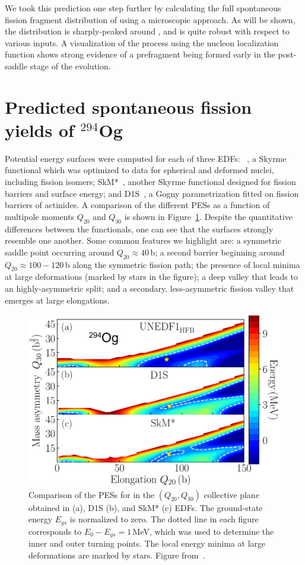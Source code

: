 We took this prediction one step further by calculating the full spontaneous fission fragment distribution of {\Og} using a microscopic approach. As will be shown, the distribution is sharply-peaked around {\Pb}, and is quite robust with respect to various inputs. A visualization of the process using the nucleon localization function shows strong evidence of a {\Pb} prefragment being formed early in the post-saddle stage of the evolution.

\section{Predicted spontaneous fission yields of $^{294}$Og}

Potential energy surfaces were computed for each of three EDFs: \hfb~\cite{Schunck2015}, a Skyrme functional which was optimized to data for spherical and deformed nuclei, including fission isomers; SkM*~\cite{Bartel1982}, another Skyrme functional designed for fission barriers and surface energy; and D1S~\cite{Berger1989}, a Gogny parametrization fitted on fission barriers of actinides. A comparison of the different PESs as a function of multipole moments $Q_{20}$ and $Q_{30}$ is shown in Figure~\ref{fig:294ogthreepes}. Despite the quantitative differences between the functionals, one can see that the surfaces strongly resemble one another. Some common features we highlight are: a symmetric saddle point occurring around $Q_{20}\approx 40$\,b; a second barrier beginning around $Q_{20}\approx100-120$\,b along the symmetric fission path; the presence of local minima at large deformations (marked by stars in the figure); a deep valley that leads to an highly-asymmetric split; and a secondary, less-asymmetric fission valley that emerges at large elongations.


\begin{figure}
	\centering
	\includegraphics[width=0.7\linewidth]{TeX_files/294Og_three_PES}
	\caption{Comparison of the PESs for \Og{} in the $(Q_{20},Q_{30})$ collective plane obtained in \hfb{} (a), D1S (b), and SkM* (c) EDFs. The ground-state energy $E_{gs}$ is normalized to zero. The dotted line in each figure corresponds to $E_0-E_{gs}=1$\,MeV, which was used to determine the inner and outer turning points. The local energy minima at large deformations are marked by stars. Figure from~\cite{matheson2019}.}
	\label{fig:294ogthreepes}
\end{figure}

